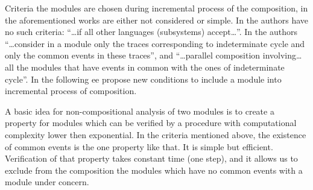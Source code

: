 \documentclass[a4paper, 10pt, conference]{ieeeconf}
\begin{document}
Criteria the modules are chosen during incremental process of
the composition, in the aforementioned works are either not considered or
simple. In \cite{debouk_modular_2002} the authors have no such criteria: 
``\ldots if all other languages (subsystems) accept\ldots''.
In \cite{contant_diagnosability_2006} the authors ``\ldots consider in a module
only the traces corresponding to indeterminate cycle and only the common events
in these traces'', and ``\ldots parallel composition involving\ldots all the
modules that have events in common with the ones of indeterminate cycle''.
In the following ee propose new conditions to include a module into incremental
process of composition.



A basic idea for non-compositional analysis of two modules is to create a
property for modules which can be verified by a procedure with computational
complexity lower then exponential. In the criteria mentioned above, the
existence of common events is the one property like that. It is simple but
efficient. Verification of that property takes constant time (one step), and it
allows us to exclude from the composition the modules which have no
common events with a module under concern.
\end{document}
